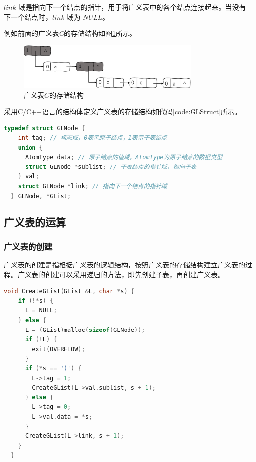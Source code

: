 \documentclass[lang=cn,newtx,10pt,scheme=chinese]{../elegantbook}
\begin{document}
  $link$ 域是指向下一个结点的指针，用于将广义表中的各个结点连接起来。当没有下一个结点时，$link$ 域为 $NULL$。

  例如前面的广义表$C$的存储结构如图\ref{fig:GLStructGraph}所示。

  \begin{figure}[!htbp]
    \centering
    \includegraphics[width=0.8\textwidth]{./figure/pdf/cropped/GLStructGraph.pdf}
    \caption{广义表$C$的存储结构}
    \label{fig:GLStructGraph}
  \end{figure}


  采用C/C++语言的结构体定义广义表的存储结构如代码\ref{code:GLStruct}所示。

  \begin{lstlisting}[language=C++, caption={广义表的存储结构}, label={code:GLStruct}]
  typedef struct GLNode {
    int tag; // 标志域，0表示原子结点，1表示子表结点
    union {
      AtomType data; // 原子结点的值域，AtomType为原子结点的数据类型
      struct GLNode *sublist; // 子表结点的指针域，指向子表
    } val;
    struct GLNode *link; // 指向下一个结点的指针域
  } GLNode, *GList;
  \end{lstlisting}

\subsection{广义表的运算}

\subsubsection{广义表的创建}

广义表的创建是指根据广义表的逻辑结构，按照广义表的存储结构建立广义表的过程。广义表的创建可以采用递归的方法，即先创建子表，再创建广义表。

\begin{lstlisting}[language=C++, caption={广义表的创建}]
  void CreateGList(GList &L, char *s) {
    if (!*s) {
      L = NULL;
    } else {
      L = (GList)malloc(sizeof(GLNode));
      if (!L) {
        exit(OVERFLOW);
      }
      if (*s == '(') {
        L->tag = 1;
        CreateGList(L->val.sublist, s + 1);
      } else {
        L->tag = 0;
        L->val.data = *s;
      }
      CreateGList(L->link, s + 1);
    }
  }
\end{lstlisting}
\end{document}
